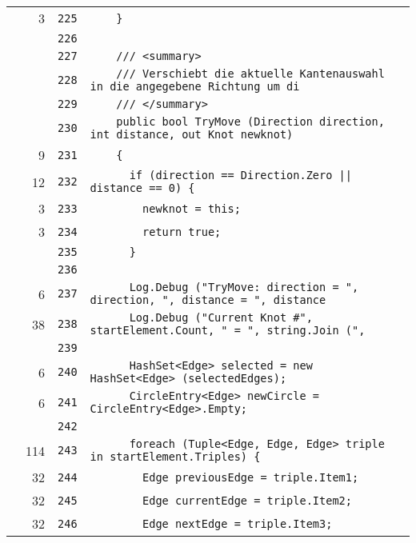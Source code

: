 \documentclass[a4paper,10pt]{article}
\begin{document}
\begin{longtable}[l]{lrrl}
\cellcolor{green} & 3 & \verb~225~ & \verb~    }~\\
\cellcolor{gray} &  & \verb~226~ & \verb~~\\
\cellcolor{gray} &  & \verb~227~ & \verb~    /// <summary>~\\
\cellcolor{gray} &  & \verb~228~ & \verb~    /// Verschiebt die aktuelle Kantenauswahl in die angegebene Richtung um di~\\
\cellcolor{gray} &  & \verb~229~ & \verb~    /// </summary>~\\
\cellcolor{gray} &  & \verb~230~ & \verb~    public bool TryMove (Direction direction, int distance, out Knot newknot)~\\
\cellcolor{green} & 9 & \verb~231~ & \verb~    {~\\
\cellcolor{green} & 12 & \verb~232~ & \verb~      if (direction == Direction.Zero || distance == 0) {~\\
\cellcolor{green} & 3 & \verb~233~ & \verb~        newknot = this;~\\
\cellcolor{green} & 3 & \verb~234~ & \verb~        return true;~\\
\cellcolor{gray} &  & \verb~235~ & \verb~      }~\\
\cellcolor{gray} &  & \verb~236~ & \verb~~\\
\cellcolor{green} & 6 & \verb~237~ & \verb~      Log.Debug ("TryMove: direction = ", direction, ", distance = ", distance~\\
\cellcolor{green} & 38 & \verb~238~ & \verb~      Log.Debug ("Current Knot #", startElement.Count, " = ", string.Join (", ~\\
\cellcolor{gray} &  & \verb~239~ & \verb~~\\
\cellcolor{green} & 6 & \verb~240~ & \verb~      HashSet<Edge> selected = new HashSet<Edge> (selectedEdges);~\\
\cellcolor{green} & 6 & \verb~241~ & \verb~      CircleEntry<Edge> newCircle = CircleEntry<Edge>.Empty;~\\
\cellcolor{gray} &  & \verb~242~ & \verb~~\\
\cellcolor{green} & 114 & \verb~243~ & \verb~      foreach (Tuple<Edge, Edge, Edge> triple in startElement.Triples) {~\\
\cellcolor{green} & 32 & \verb~244~ & \verb~        Edge previousEdge = triple.Item1;~\\
\cellcolor{green} & 32 & \verb~245~ & \verb~        Edge currentEdge = triple.Item2;~\\
\cellcolor{green} & 32 & \verb~246~ & \verb~        Edge nextEdge = triple.Item3;~\\

\end{longtable}
\end{document}
